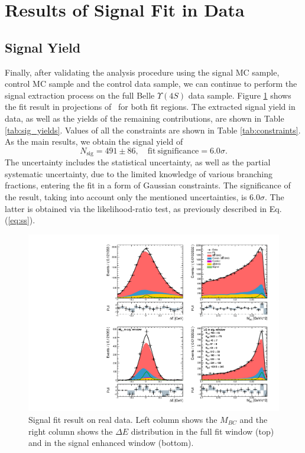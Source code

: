 \section{Results of Signal Fit in Data}\label{sec:final-results-from-data}

\subsection{Signal Yield}

Finally, after validating the analysis procedure using the signal MC sample, control MC sample and the control data sample, we can continue to perform the signal extraction process on the full Belle $\Upsilon(4S)$ data sample. Figure \ref{fig:sig_fit_data} shows the fit result in projections of \vars~for both fit regions. The extracted signal yield in data, as well as the yields of the remaining contributions, are shown in Table \ref{tab:sig_yields}. Values of all the constraints are shown in Table \ref{tab:constraints}. As the main results, we obtain the signal yield of 
\begin{equation}
\label{eq:main_result}
N_{\mathrm{sig}} = 491 \pm 86,\quad\mathrm{fit~significance} = 6.0\sigma.
\end{equation}
The uncertainty includes the statistical uncertainty, as well as the partial systematic uncertainty, due to the limited knowledge of various branching fractions, entering the fit in a form of Gaussian constraints. The significance of the result, taking into account only the mentioned uncertainties, is $6.0\sigma$. The latter is obtained via the likelihood-ratio test, as previously described in Eq. (\ref{eq:ss}).

\begin{figure}[H]
	\centering
	\captionsetup{width=0.8\linewidth}
	\includegraphics[width=\linewidth]{fig/sig_fit_data}
	\caption{Signal fit result on real data. Left column shows the $M_{BC}$ and the right column shows the $\Delta E$ distribution in the full fit window (top) and in the signal enhanced window (bottom).}
	\label{fig:sig_fit_data}
\end{figure} 

